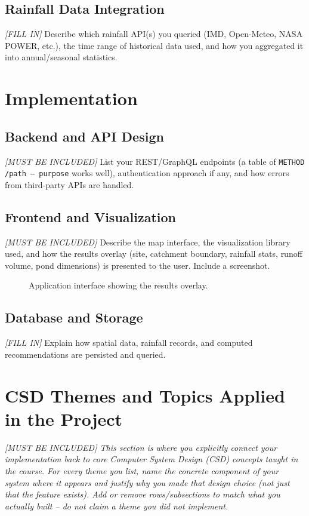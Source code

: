 \documentclass[manuscript,screen,review]{acmart}
\begin{document}
\subsection{Rainfall Data Integration}
\textit{[FILL IN]} Describe which rainfall API(s) you queried (IMD,
Open-Meteo, NASA POWER, etc.), the time range of historical data
used, and how you aggregated it into annual/seasonal statistics.

\section{Implementation}
\label{sec:implementation}

\subsection{Backend and API Design}
\textit{[MUST BE INCLUDED]} List your REST/GraphQL endpoints (a table of
\texttt{METHOD /path -- purpose} works well), authentication approach
if any, and how errors from third-party APIs are handled.

\subsection{Frontend and Visualization}
\textit{[MUST BE INCLUDED]} Describe the map interface, the visualization
library used, and how the results overlay (site, catchment boundary,
rainfall stats, runoff volume, pond dimensions) is presented to the
user. Include a screenshot.

\begin{figure}[h]
  \centering
  \caption{Application interface showing the results overlay.}
  \label{fig:ui}
\end{figure}

\subsection{Database and Storage}
\textit{[FILL IN]} Explain how spatial data, rainfall records, and
computed recommendations are persisted and queried.

\section{CSD Themes and Topics Applied in the Project}
\label{sec:csd-themes}
\textit{[MUST BE INCLUDED] This section is where you explicitly connect your
implementation back to core Computer System Design (CSD)
concepts taught in the course. For every theme you list, name the
concrete component of your system where it appears and justify why
you made that design choice (not just that the feature exists).
Add or remove rows/subsections to match what you actually built --
do not claim a theme you did not implement.}
\end{document}
